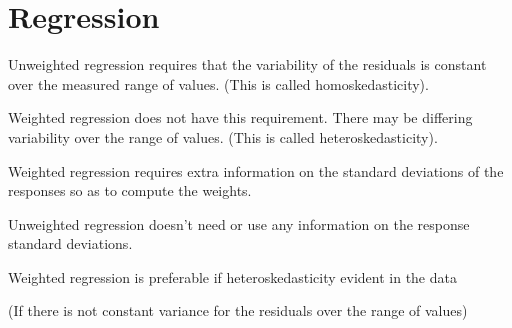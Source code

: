 \section{Regression}
Unweighted regression requires that the variability of the
residuals is constant over the measured range of values.
(This is called homoskedasticity).

Weighted regression does not have this requirement.
There may be differing variability over the range of values.
(This is called heteroskedasticity).

Weighted regression requires extra information on the standard deviations of the responses so as to compute the weights.

Unweighted regression doesn’t need or use any information on the response standard deviations.

Weighted regression is preferable if heteroskedasticity evident in the data

(If there is not constant variance for the residuals over the range of values)
